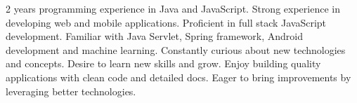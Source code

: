 

\begin{cvparagraph}

2 years programming experience in Java and JavaScript. Strong experience in developing web and mobile applications. Proficient in full stack JavaScript development. Familiar with Java Servlet, Spring framework, Android development and machine learning. Constantly curious about new technologies and concepts. Desire to learn new skills and grow. Enjoy building quality applications with clean code and detailed docs. Eager to bring improvements by leveraging better technologies.
\end{cvparagraph}



